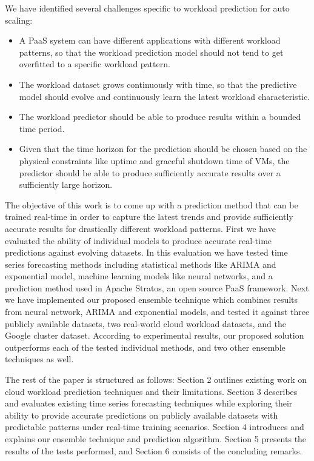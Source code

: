 We have identified several challenges specific to workload prediction for auto scaling:
\begin{itemize}
\item A PaaS system can have different applications with different workload patterns, so that the workload prediction model should not tend to get overfitted to a specific workload pattern.
\item The workload dataset grows continuously with time, so that the predictive model should evolve and continuously learn the latest workload characteristic. 
\item The workload predictor should be able to produce results within a bounded time period.
\item Given that the time horizon for the prediction should be chosen based on the physical constraints like uptime and graceful shutdown time of VMs, the predictor should be able to produce sufficiently accurate results over a sufficiently large horizon.
\end{itemize}

The objective of this work is to come up with a prediction method that can be trained real-time in order to capture the latest trends and provide sufficiently accurate results for drastically different workload patterns. First we have evaluated the ability of individual models to produce accurate real-time predictions against evolving datasets. In this evaluation we have tested time series forecasting methods including statistical methods like ARIMA and exponential model, machine learning models like neural networks, and a prediction method used in Apache Stratos, an open source PaaS framework. Next we have implemented our proposed ensemble technique which combines results from neural network, ARIMA and exponential models, and tested it against three publicly available datasets, two real-world cloud workload datasets, and the Google cluster dataset. According to experimental results, our proposed solution outperforms each of the tested individual methods, and two other ensemble techniques as well.

The rest of the paper is structured as follows: Section 2 outlines existing work on cloud workload prediction techniques and their limitations. Section 3 describes and evaluates existing time series forecasting techniques while exploring their ability to provide accurate predictions on publicly available datasets with predictable patterns under real-time training scenarios. Section 4 introduces and explains our ensemble technique and prediction algorithm. Section 5 presents the results of the tests performed, and Section 6 consists of the concluding remarks.